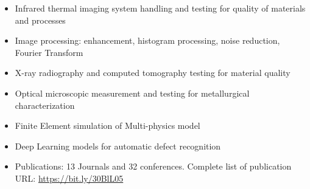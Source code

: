 














 
\begin{itemize}
     \item Infrared thermal imaging system handling and testing for quality of materials and processes 
    \item Image processing: enhancement, histogram processing, noise reduction, Fourier Transform
    \item X-ray radiography and computed tomography testing for material quality
    \item Optical microscopic measurement and testing for metallurgical characterization
    \item Finite Element simulation of Multi-physics model
    \item Deep Learning models for automatic defect recognition
    \item Publications: 13 Journals and 32 conferences. Complete list of publication URL: \href{https://bit.ly/30BlL05}{https://bit.ly/30BlL05}
\end{itemize}








